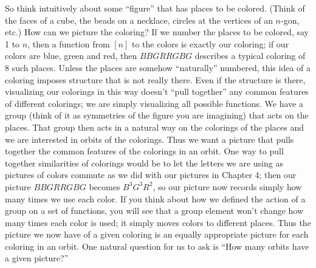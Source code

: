 \documentclass[10pt,]{book}
\theoremstyle{plain}
\theoremstyle{definition}
\theoremstyle{definition}
\numberwithin{equation}{chapter}
\begin{document}
So think intuitively about some ``figure'' that has places to be colored. (Think of the faces of a cube, the beads on a necklace, circles at the vertices of an \(n\)-gon, etc.) How can we picture the coloring? If we number the places to be colored, say 1 to \(n\), then a function from \([n]\) to the colors is exactly our coloring; if our colors are blue, green and red, then \(BBGRRGBG\) describes a typical coloring of 8 such places. Unless the places are somehow ``naturally'' numbered, this idea of a coloring imposes structure that is not really there. Even if the structure is there, visualizing our colorings in this way doesn't ``pull together'' any common features of different colorings; we are simply visualizing all possible functions. We have a group (think of it as symmetries of the figure you are imagining) that acts on the places. That group then acts in a natural way on the colorings of the places and we are interested in orbits of the colorings. Thus we want a picture that pulls together the common features of the colorings in an orbit. One way to pull together similarities of colorings would be to let the letters we are using as pictures of colors commute as we did with our pictures in Chapter 4; then our picture \(BBGRRGBG\) becomes \(B^3G^3R^2\), so our picture now records simply how many times we use each color. If you think about how we defined the action of a group on a set of functions, you will see that a group element won't change how many times each color is used; it simply moves colors to different places. Thus the picture we now have of a given coloring is an equally appropriate picture for each coloring in an orbit. One natural question for us to ask is ``How many orbits have a given picture?''%
\end{document}
